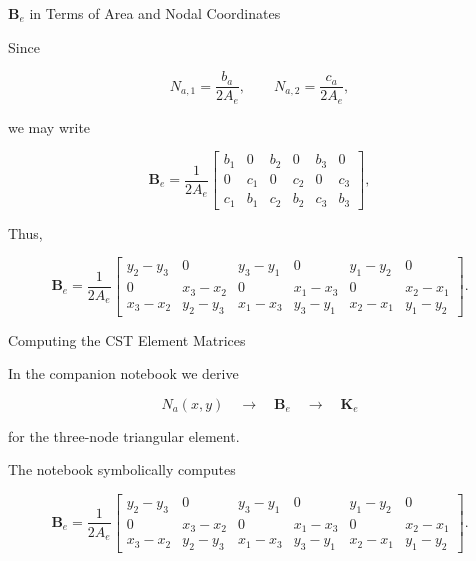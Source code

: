 \documentclass[aspectratio=169]{beamer}
\begin{document}
\begin{frame}{\( \mathbf{B}_e \) in Terms of Area and Nodal Coordinates}

Since

\[
N_{a,1}=\frac{b_a}{2A_e},
\qquad
N_{a,2}=\frac{c_a}{2A_e},
\]

we may write

\[
\mathbf{B}_e=
\frac{1}{2A_e}
\begin{bmatrix}
b_1 & 0   & b_2 & 0   & b_3 & 0\\
0   & c_1 & 0   & c_2 & 0   & c_3\\
c_1 & b_1 & c_2 & b_2 & c_3 & b_3
\end{bmatrix},
\]


Thus,

\[
\mathbf{B}_e=
\frac{1}{2A_e}
\begin{bmatrix}
y_2-y_3 & 0 & y_3-y_1 & 0 & y_1-y_2 & 0\\
0 & x_3-x_2 & 0 & x_1-x_3 & 0 & x_2-x_1\\
x_3-x_2 & y_2-y_3 & x_1-x_3 & y_3-y_1 & x_2-x_1 & y_1-y_2
\end{bmatrix}.
\]

\end{frame}
\begin{frame}{Computing the CST Element Matrices}

In the companion notebook we derive

\[
N_a(x,y)
\quad \rightarrow \quad
\mathbf{B}_e
\quad \rightarrow \quad
\mathbf{K}_e
\]

for the three-node triangular element.

\bigskip

The notebook symbolically computes

\[
\mathbf{B}_e =
\frac{1}{2A_e}
\begin{bmatrix}
y_2-y_3 & 0 & y_3-y_1 & 0 & y_1-y_2 & 0\\
0 & x_3-x_2 & 0 & x_1-x_3 & 0 & x_2-x_1\\
x_3-x_2 & y_2-y_3 & x_1-x_3 & y_3-y_1 & x_2-x_1 & y_1-y_2
\end{bmatrix}.
\]


\end{frame}
\end{document}
